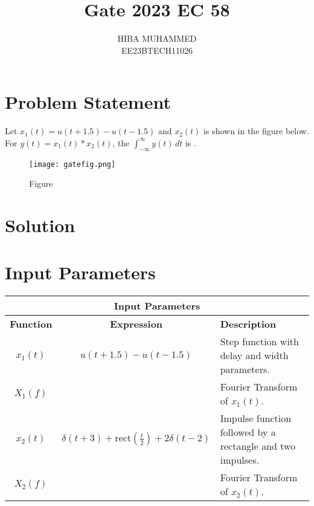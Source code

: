 \documentclass[journal,12pt,onecolumn]{IEEEtran}
\theoremstyle{remark}
\begin{document}
\let\vec\mathbf



\title{Gate 2023 EC 58}
\author{HIBA MUHAMMED\\
        EE23BTECH11026}
\maketitle

\section*{Problem Statement}
Let $x_1(t) = u(t + 1.5) - u(t - 1.5)$ and $x_2(t)$ is shown in the figure below. For $y(t) = x_1(t) * x_2(t)$, the $\int_{-\infty}^{\infty} y(t) \, dt$ is \underline{\hspace{2cm}}.

\begin{figure}[htbp]
    \centering
    \texttt{[image: gatefig.png]}
    \caption{Figure}
    \label{fig:graph}
\end{figure}

\section*{Solution}
\section*{Input Parameters}
\begin{table}[htbp]
    \centering
    \begin{tabular}{|c|c|p{6cm}|}
        \hline
        \multicolumn{3}{|c|}{\textbf{Input Parameters}} \\
        \hline
        \textbf{Function} & \textbf{Expression} & \textbf{Description} \\
        \hline
        $x_1(t)$ & $u(t + 1.5) - u(t - 1.5)$ & Step function with delay and width parameters. \\
        \hline
        $X_1(f)$ &  & Fourier Transform of $x_1(t)$. \\
        \hline
        $x_2(t)$ & $\delta(t + 3) + \text{rect}\left(\frac{t}{2}\right) + 2\delta(t - 2)$ & Impulse function followed by a rectangle and two impulses. \\
        \hline
        $X_2(f)$ &  & Fourier Transform of $x_2(t)$. \\
        \hline
    \end{tabular}
\end{table}
\end{document}
